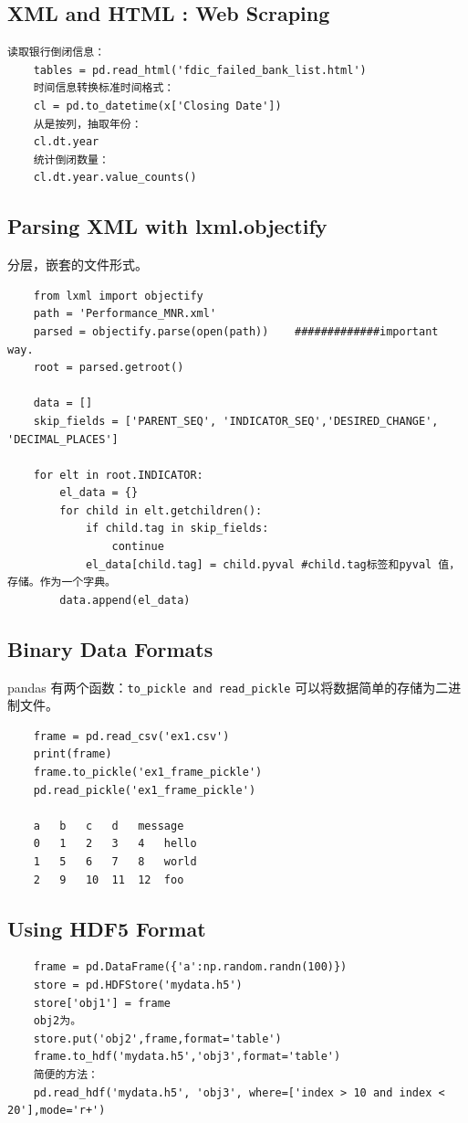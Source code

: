 \documentclass{article}
\begin{document}
\subsection{XML and HTML : Web Scraping}
\begin{lstlisting}
读取银行倒闭信息：
	tables = pd.read_html('fdic_failed_bank_list.html')
	时间信息转换标准时间格式：
	cl = pd.to_datetime(x['Closing Date'])
	从是按列，抽取年份：
	cl.dt.year
	统计倒闭数量：
	cl.dt.year.value_counts()	
\end{lstlisting}

\subsection{Parsing XML with lxml.objectify}
\noindent 分层，嵌套的文件形式。\\
\begin{lstlisting}
	from lxml import objectify
	path = 'Performance_MNR.xml'
	parsed = objectify.parse(open(path))    #############important way.
	root = parsed.getroot()
	
	data = []
	skip_fields = ['PARENT_SEQ', 'INDICATOR_SEQ','DESIRED_CHANGE', 'DECIMAL_PLACES']
	
	for elt in root.INDICATOR:
		el_data = {}
		for child in elt.getchildren():
			if child.tag in skip_fields:
				continue
			el_data[child.tag] = child.pyval #child.tag标签和pyval 值，存储。作为一个字典。
		data.append(el_data)
\end{lstlisting}

\subsection{Binary Data Formats}
pandas 有两个函数：\verb|to_pickle and read_pickle| 可以将数据简单的存储为二进制文件。
\begin{lstlisting}
	frame = pd.read_csv('ex1.csv')
	print(frame)
	frame.to_pickle('ex1_frame_pickle')
	pd.read_pickle('ex1_frame_pickle')
	
	a	b	c	d	message
	0	1	2	3	4	hello
	1	5	6	7	8	world
	2	9	10	11	12	foo
\end{lstlisting}
 
\subsection{Using HDF5 Format}

\begin{lstlisting}
	frame = pd.DataFrame({'a':np.random.randn(100)})
	store = pd.HDFStore('mydata.h5')
	store['obj1'] = frame
	obj2为。
	store.put('obj2',frame,format='table')
	frame.to_hdf('mydata.h5','obj3',format='table')
	简便的方法：
	pd.read_hdf('mydata.h5', 'obj3', where=['index > 10 and index < 20'],mode='r+')
	
	
\end{lstlisting}
\end{document}
